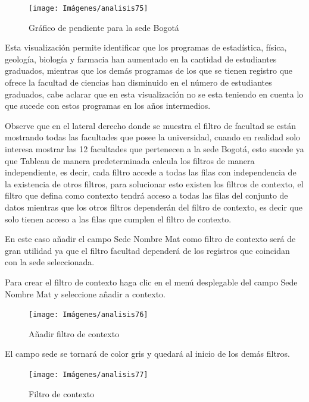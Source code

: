 \documentclass[
]{book}
\begin{document}
\begin{figure}

{\centering \texttt{[image: Imágenes/analisis75]} 

}

\caption{Gráfico de pendiente para la sede Bogotá}\label{fig:graficopendientebogota-fig}
\end{figure}

Esta visualización permite identificar que los programas de estadística, física, geología, biología y farmacia han aumentado en la cantidad de estudiantes graduados, mientras que los demás programas de los que se tienen registro que ofrece la facultad de ciencias han disminuido en el número de estudiantes graduados, cabe aclarar que en esta visualización no se esta teniendo en cuenta lo que sucede con estos programas en los años intermedios.

Observe que en el lateral derecho donde se muestra el filtro de facultad se están mostrando todas las facultades que posee la universidad, cuando en realidad solo interesa mostrar las 12 facultades que pertenecen a la sede Bogotá, esto sucede ya que Tableau de manera predeterminada calcula los filtros de manera independiente, es decir, cada filtro accede a todas las filas con independencia de la existencia de otros filtros, para solucionar esto existen los filtros de contexto, el filtro que defina como contexto tendrá acceso a todas las filas del conjunto de datos mientras que los otros filtros dependerán del filtro de contexto, es decir que solo tienen acceso a las filas que cumplen el filtro de contexto.

En este caso añadir el campo Sede Nombre Mat como filtro de contexto será de gran utilidad ya que el filtro facultad dependerá de los registros que coincidan con la sede seleccionada.

Para crear el filtro de contexto haga clic en el menú desplegable del campo Sede Nombre Mat y seleccione añadir a contexto.

\begin{figure}

{\centering \texttt{[image: Imágenes/analisis76]} 

}

\caption{Añadir filtro de contexto}\label{fig:contextobogota-fig}
\end{figure}

El campo sede se tornará de color gris y quedará al inicio de los demás filtros.

\begin{figure}

{\centering \texttt{[image: Imágenes/analisis77]} 

}

\caption{Filtro de contexto}\label{fig:1contextobogota-fig}
\end{figure}
\end{document}
